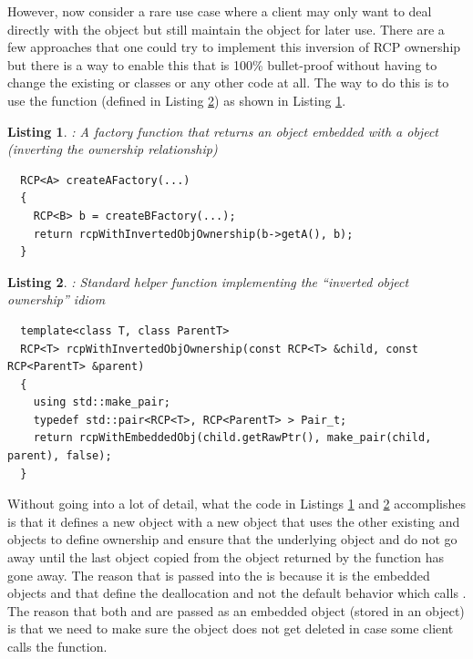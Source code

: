 \documentclass[pdf,ps2pdf,11pt]{SANDreport}
\newtheorem{listing}{Listing}
\begin{document}
However, now consider a rare use case where a client may only want to
deal directly with the {} object but still maintain the
{} object for later use.  There are a few approaches that
one could try to implement this inversion of RCP ownership but there
is a way to enable this that is 100\% bullet-proof without having to
change the existing {} or {} classes or any other
code at all.  The way to do this is to use the
{} function (defined in
Listing {}\ref{listing:rcpWithInvertedObjOwnership}) as shown in
Listing {}\ref{listing:A_owns_B_owns_A}.

\begin{listing}: A factory function that returns an {} object
embedded with a {} object (inverting the ownership relationship) \\
\label{listing:A_owns_B_owns_A}
{\small\begin{verbatim}
  RCP<A> createAFactory(...)
  {
    RCP<B> b = createBFactory(...);
    return rcpWithInvertedObjOwnership(b->getA(), b);
  }
\end{verbatim}}
\end{listing}


\begin{listing}: Standard helper function implementing the ``inverted
object ownership'' idiom \\
\label{listing:rcpWithInvertedObjOwnership}
{\small\begin{verbatim}
  template<class T, class ParentT>
  RCP<T> rcpWithInvertedObjOwnership(const RCP<T> &child, const RCP<ParentT> &parent)
  {
    using std::make_pair;
    typedef std::pair<RCP<T>, RCP<ParentT> > Pair_t;
    return rcpWithEmbeddedObj(child.getRawPtr(), make_pair(child, parent), false);
  }
\end{verbatim}}
\end{listing}




Without going into a lot of detail, what the code in Listings
{}\ref{listing:A_owns_B_owns_A} and
{}\ref{listing:rcpWithInvertedObjOwnership} accomplishes is that it
defines a new {} object with a new {}
object that uses the other existing {} and
{} objects to define ownership and ensure that the
underlying {} object and {} do not go away until
the last {} object copied from the object returned by
the function {} has gone away.  The reason
that {} is passed into the
{} is because it is the embedded
objects {} and {} that define the
deallocation and not the default behavior which calls
{}.  The reason that both {} and
{} are passed as an embedded object (stored in an
{} object) is that we need to make sure the
{} object does not get deleted in case some client calls the
{} function.
\end{document}
